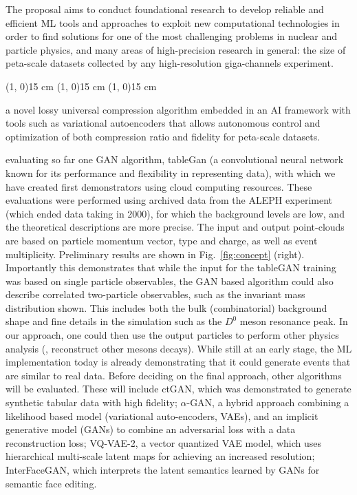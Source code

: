  

The proposal aims to conduct foundational research to develop reliable and efficient ML tools and approaches to exploit new computational technologies in order to find solutions for one of the most challenging problems in nuclear and particle physics, and many areas of high-precision research in general: the size of peta-scale datasets collected by any high-resolution giga-channels experiment. 
\clearpage





\line(1, 0){15 cm}
\line(1, 0){15 cm}
\line(1, 0){15 cm}

a novel lossy universal compression algorithm embedded in an AI framework with tools such as variational autoencoders that allows autonomous control and optimization of both compression ratio and fidelity for peta-scale datasets.

evaluating so far one GAN algorithm, tableGan (a convolutional neural network known for its performance and flexibility in representing data), with which we have created first demonstrators using cloud computing resources. These evaluations were performed using {\eecol} archived data from the ALEPH experiment (which ended data taking in 2000), for which the background levels are low, and the theoretical descriptions are more precise. The input and output point-clouds are based on particle momentum vector,  type and charge, as well as event multiplicity. Preliminary results are shown in Fig.~\ref{fig:concept} (right). Importantly this demonstrates that while the input for the tableGAN training was based on single particle observables, the GAN based algorithm could also describe correlated two-particle observables, such as the invariant mass distribution shown. This includes both the bulk (combinatorial) background shape and fine details in the simulation such as the $D^0$ meson resonance peak. In our approach, one could then use the output particles to perform other physics analysis (\eg, reconstruct other mesons decays). While still at an early stage, the ML implementation today is already demonstrating that it could generate {\eecol} events that are similar to real data. Before deciding on the final approach, other algorithms will be evaluated. These will include ctGAN, which was demonstrated to generate synthetic tabular data with high fidelity; $\alpha$-GAN, a hybrid approach combining a likelihood based model (variational auto-encoders, VAEs), and an implicit generative model (GANs) to combine an adversarial loss with a data reconstruction loss; VQ-VAE-2, a vector quantized VAE model, which uses hierarchical multi-scale latent maps for achieving an increased resolution; InterFaceGAN, which interprets the latent semantics learned by GANs for semantic face editing. 

